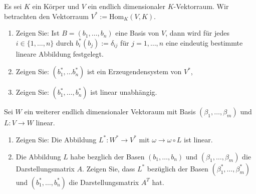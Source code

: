 \begin{Problem}
	Es sei $K$ ein Körper und $V$ ein endlich dimensionaler $K$-Vektorraum. Wir betrachten den Vektorraum $V^* := \text{Hom}_K (V, K)$.
	\begin{enumerate}[label=(\alph*)]
		\item Zeigen Sie: Ist $B = (b_1 , \dots , b_n )$ eine Basis von $V$, dann wird für jedes $i \in \{1, \dots , n\}$ durch $b^*_i (b_j) := \delta_{ij}$ für $j = 1, \dots , n$ eine eindeutig bestimmte lineare Abbildung festgelegt.
		\item Zeigen Sie: $(b_1^*,\dots b_n^*)$ ist ein Erzeugendensystem von $V^*$,
		\item Zeigen Sie: $(b_1^*,\dots, b_n^*)$ ist linear unabhängig.
	\end{enumerate}
	Sei $W$ ein weiterer endlich dimensionaler Vektoraum mit Basis $(\beta_1, \dots , \beta_m )$ und $L : V \to W$ linear.
		\begin{enumerate}[label=(\alph*),resume]
			\item Zeigen Sie: Die Abbildung $L^* : W^* \to V^*$ mit $\omega \to \omega \circ L$ ist linear.
			\item Die Abbildung $L$ habe bezglich der Basen $(b_1,\dots, b _n)$ und $(\beta_1,\dots, \beta_m)$ die Darstellungsmatrix $A$. Zeigen Sie, dass $L^*$ bezüglich der Basen $(\beta_1^*,\dots, \beta_m^*)$ und $(b_1^*,\dots, b_n^*)$ die Darstellungsmatrix $A^T$ hat.
		\end{enumerate}
\end{Problem}
